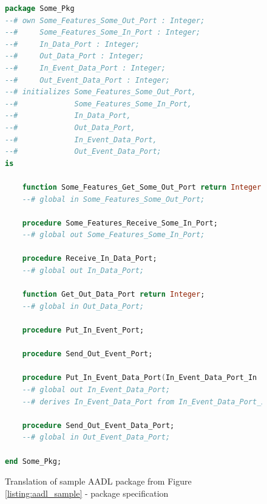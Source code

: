 \begin{figure}[ht]
\singlespacing
\begin{lstlisting}[language=ada, frame=single, gobble=0]
package Some_Pkg
--# own Some_Features_Some_Out_Port : Integer;
--#     Some_Features_Some_In_Port : Integer;
--#     In_Data_Port : Integer;
--#     Out_Data_Port : Integer;
--#     In_Event_Data_Port : Integer;
--#     Out_Event_Data_Port : Integer;
--# initializes Some_Features_Some_Out_Port,
--#             Some_Features_Some_In_Port,
--#             In_Data_Port,
--#             Out_Data_Port,
--#             In_Event_Data_Port,
--#             Out_Event_Data_Port;
is

    function Some_Features_Get_Some_Out_Port return Integer;
    --# global in Some_Features_Some_Out_Port;

    procedure Some_Features_Receive_Some_In_Port;
    --# global out Some_Features_Some_In_Port;

    procedure Receive_In_Data_Port;
    --# global out In_Data_Port;

    function Get_Out_Data_Port return Integer;
    --# global in Out_Data_Port;

    procedure Put_In_Event_Port;

    procedure Send_Out_Event_Port;

    procedure Put_In_Event_Data_Port(In_Event_Data_Port_In : Integer);
    --# global out In_Event_Data_Port;
    --# derives In_Event_Data_Port from In_Event_Data_Port_In;

    procedure Send_Out_Event_Data_Port;
    --# global in Out_Event_Data_Port;

end Some_Pkg;
\end{lstlisting}
\doublespacing
\caption{Translation of sample AADL package from Figure \ref{listing:aadl_sample} - package specification}
\label{listing:package_mapping_spec}
\end{figure}

